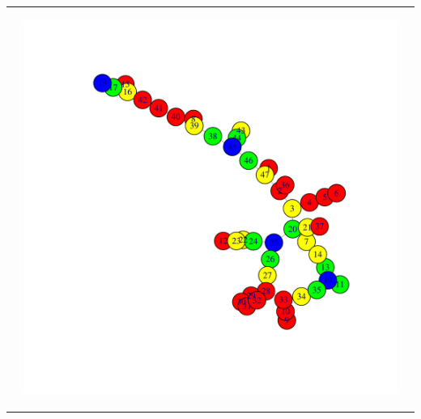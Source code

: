 \documentclass[eu,gi]{ifirak}\usepackage[]{graphicx}\usepackage[]{color}
\begin{document}
\begin{table}[hbt!]
\begin{tabular}{c c c}
\begin{center}
\end{center}
&
\begin{center}
    \includegraphics[scale=0.3]{graph2.pdf}
\end{center}\\


\end{tabular}
\end{table}
\end{document}
